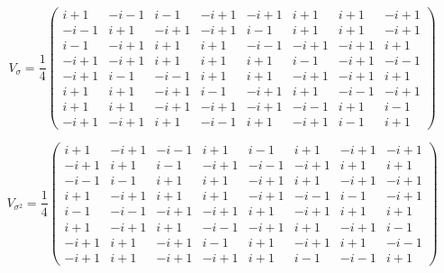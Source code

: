 \documentclass[a4paper]{article}
\begin{document}
  \begin{equation}
    V_{\sigma} = \frac{1}{4}
    \displaystyle \left(\begin{array}{rrrrrrrr}
i + 1 & -i - 1 & i - 1 & -i + 1 & -i + 1 & i + 1 & i + 1 & -i + 1 \\
-i - 1 & i + 1 & -i + 1 & -i + 1 & i - 1 & i + 1 & i + 1 & -i + 1 \\
i - 1 & -i + 1 & i + 1 & i + 1 & -i - 1 & -i + 1 & -i + 1 & i + 1 \\
-i + 1 & -i + 1 & i + 1 & i + 1 & i + 1 & i - 1 & -i + 1 & -i - 1 \\
-i + 1 & i - 1 & -i - 1 & i + 1 & i + 1 & -i + 1 & -i + 1 & i + 1 \\
i + 1 & i + 1 & -i + 1 & i - 1 & -i + 1 & i + 1 & -i - 1 & -i + 1 \\
i + 1 & i + 1 & -i + 1 & -i + 1 & -i + 1 & -i - 1 & i + 1 & i - 1 \\
-i + 1 & -i + 1 & i + 1 & -i - 1 & i + 1 & -i + 1 & i - 1 & i + 1
\end{array}\right)
  \end{equation}

  \begin{equation}
    V_{\sigma^2} = \frac{1}{4}
    \displaystyle \left(\begin{array}{rrrrrrrr}
i + 1 & -i + 1 & -i - 1 & i + 1 & i - 1 & i + 1 & -i + 1 & -i + 1 \\
-i + 1 & i + 1 & i - 1 & -i + 1 & -i - 1 & -i + 1 & i + 1 & i + 1 \\
-i - 1 & i - 1 & i + 1 & i + 1 & -i + 1 & i + 1 & -i + 1 & -i + 1 \\
i + 1 & -i + 1 & i + 1 & i + 1 & -i + 1 & -i - 1 & i - 1 & -i + 1 \\
i - 1 & -i - 1 & -i + 1 & -i + 1 & i + 1 & -i + 1 & i + 1 & i + 1 \\
i + 1 & -i + 1 & i + 1 & -i - 1 & -i + 1 & i + 1 & -i + 1 & i - 1 \\
-i + 1 & i + 1 & -i + 1 & i - 1 & i + 1 & -i + 1 & i + 1 & -i - 1 \\
-i + 1 & i + 1 & -i + 1 & -i + 1 & i + 1 & i - 1 & -i - 1 & i + 1
\end{array}\right)
  \end{equation}
  
\end{document}
